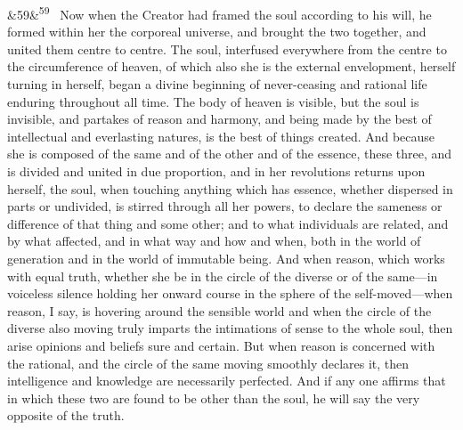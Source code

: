 \documentclass[12pt]{article}
\newcommand{\para}[1][]{\par\noindent\ifx&#1&\else\textsuperscript{\footnotesize #1}~\fi}
\begin{document}
\para[59] Now when the Creator had framed the soul according to his will, he formed within her the corporeal universe, and brought the two together, and united them centre to centre. The soul, interfused everywhere from the centre to the circumference of heaven, of which also she is the external envelopment, herself turning in herself, began a divine beginning of never-ceasing and rational life enduring throughout all time. The body of heaven is visible, but the soul is invisible, and partakes of reason and harmony, and being made by the best of intellectual and everlasting natures, is the best of things created. And because she is composed of the same and of the other and of the essence, these three, and is divided and united in due proportion, and in her revolutions returns upon herself, the soul, when touching anything which has essence, whether dispersed in parts or undivided, is stirred through all her powers, to declare the sameness or difference of that thing and some other; and to what individuals are related, and by what affected, and in what way and how and when, both in the world of generation and in the world of immutable being. And when reason, which works with equal truth, whether she be in the circle of the diverse or of the same---in voiceless silence holding her onward course in the sphere of the self-moved---when reason, I say, is hovering around the sensible world and when the circle of the diverse also moving truly imparts the intimations of sense to the whole soul, then arise opinions and beliefs sure and certain. But when reason is concerned with the rational, and the circle of the same moving smoothly declares it, then intelligence and knowledge are necessarily perfected. And if any one affirms that in which these two are found to be other than the soul, he will say the very opposite of the truth.
\end{document}

